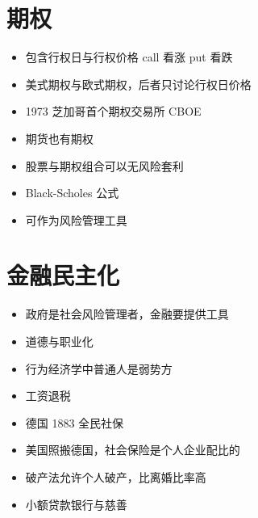 \documentclass[]{book}
\providecommand{\tightlist}{%
  \setlength{\itemsep}{0pt}\setlength{\parskip}{0pt}}
\begin{document}
\hypertarget{ux671fux6743}{%
\section{期权}\label{ux671fux6743}}

\begin{itemize}
\tightlist
\item
  包含行权日与行权价格 call 看涨 put 看跌
\item
  美式期权与欧式期权，后者只讨论行权日价格
\item
  1973 芝加哥首个期权交易所 CBOE
\item
  期货也有期权
\item
  股票与期权组合可以无风险套利
\item
  Black-Scholes 公式
\item
  可作为风险管理工具
\end{itemize}

\hypertarget{ux91d1ux878dux6c11ux4e3bux5316}{%
\section{金融民主化}\label{ux91d1ux878dux6c11ux4e3bux5316}}

\begin{itemize}
\tightlist
\item
  政府是社会风险管理者，金融要提供工具
\item
  道德与职业化
\item
  行为经济学中普通人是弱势方
\item
  工资退税
\item
  德国 1883 全民社保
\item
  美国照搬德国，社会保险是个人企业配比的
\item
  破产法允许个人破产，比离婚比率高
\item
  小额贷款银行与慈善
\end{itemize}
\end{document}
